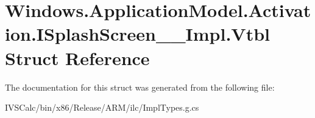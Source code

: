 \hypertarget{struct_windows_1_1_application_model_1_1_activation_1_1_i_splash_screen_____impl_1_1_vtbl}{}\section{Windows.\+Application\+Model.\+Activation.\+I\+Splash\+Screen\+\_\+\+\_\+\+Impl.\+Vtbl Struct Reference}
\label{struct_windows_1_1_application_model_1_1_activation_1_1_i_splash_screen_____impl_1_1_vtbl}


The documentation for this struct was generated from the following file\+:\begin{DoxyCompactItemize}
\item 
I\+V\+S\+Calc/bin/x86/\+Release/\+A\+R\+M/ilc/Impl\+Types.\+g.\+cs\end{DoxyCompactItemize}

